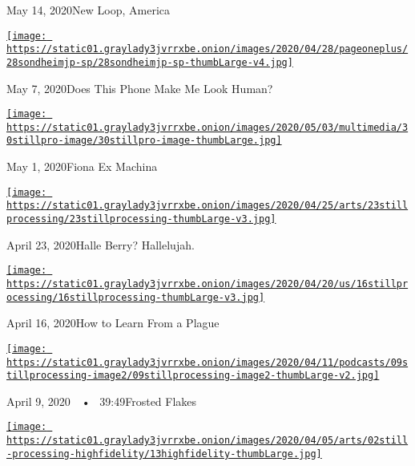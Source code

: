 May 14, 2020New Loop, America

\href{https://www.nytimes3xbfgragh.onion/2020/05/07/podcasts/still-processing-internet-vulnerability-sondheim-parks-recreation.html?action=click\&module=audio-series-bar\&region=header\&pgtype=Article}{\texttt{[image: https://static01.graylady3jvrrxbe.onion/images/2020/04/28/pageoneplus/28sondheimjp-sp/28sondheimjp-sp-thumbLarge-v4.jpg]}}

May 7, 2020Does This Phone Make Me Look Human?

\href{https://www.nytimes3xbfgragh.onion/2020/04/30/podcasts/still-processing-fiona-apple-fetch-bolt-cutters.html?action=click\&module=audio-series-bar\&region=header\&pgtype=Article}{\texttt{[image: https://static01.graylady3jvrrxbe.onion/images/2020/05/03/multimedia/30stillpro-image/30stillpro-image-thumbLarge.jpg]}}

May 1, 2020Fiona Ex Machina

\href{https://www.nytimes3xbfgragh.onion/2020/04/23/podcasts/still-processing-halle-berry-sharon-stone-catwoman-quarantine.html?action=click\&module=audio-series-bar\&region=header\&pgtype=Article}{\texttt{[image: https://static01.graylady3jvrrxbe.onion/images/2020/04/25/arts/23stillprocessing/23stillprocessing-thumbLarge-v3.jpg]}}

April 23, 2020Halle Berry? Hallelujah.

\href{https://www.nytimes3xbfgragh.onion/2020/04/16/podcasts/still-processing-AIDS-survive-coronavirus.html?action=click\&module=audio-series-bar\&region=header\&pgtype=Article}{\texttt{[image: https://static01.graylady3jvrrxbe.onion/images/2020/04/20/us/16stillprocessing/16stillprocessing-thumbLarge-v3.jpg]}}

April 16, 2020How to Learn From a Plague

\href{https://www.nytimes3xbfgragh.onion/2020/04/09/podcasts/still-processing-tiger-king.html?action=click\&module=audio-series-bar\&region=header\&pgtype=Article}{\texttt{[image: https://static01.graylady3jvrrxbe.onion/images/2020/04/11/podcasts/09stillprocessing-image2/09stillprocessing-image2-thumbLarge-v2.jpg]}}

April 9, 2020~~•~ 39:49Frosted Flakes

\href{https://www.nytimes3xbfgragh.onion/2020/04/02/podcasts/high-fidelity-zoe-kravitz.html?action=click\&module=audio-series-bar\&region=header\&pgtype=Article}{\texttt{[image: https://static01.graylady3jvrrxbe.onion/images/2020/04/05/arts/02still-processing-highfidelity/13highfidelity-thumbLarge.jpg]}}

